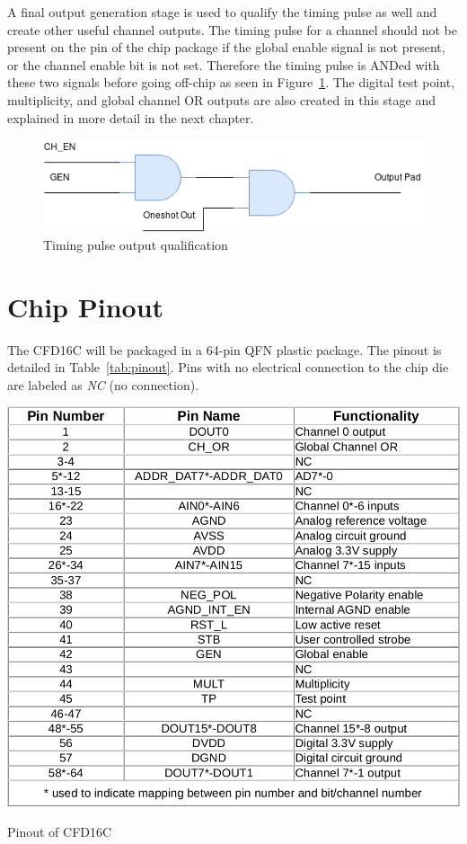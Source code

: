 \documentclass[12pt,oneside,final]{siuethesis}
\theoremstyle{definition}
\begin{document}
\par A final output generation stage is used to qualify the timing pulse as well and create other useful channel outputs. The timing pulse for a channel should not be present on the pin of the chip package if the global enable signal is not present, or the channel enable bit is not set. Therefore the timing pulse is ANDed with these two signals before going off-chip as seen in Figure~\ref{fig:output-qual}. The digital test point, multiplicity, and global channel OR outputs are also created in this stage and explained in more detail in the next chapter.\\

\begin{figure}[h!]
\centering
\includegraphics[scale=.7,keepaspectratio=true]{./ch2_figures/output.png} 
\caption{Timing pulse output qualification}
\label{fig:output-qual}
\end{figure}



\section{Chip Pinout}
\par The CFD16C will be packaged in a 64-pin QFN plastic package. The pinout is detailed in Table~\ref{tab:pinout}. Pins with no electrical connection to the chip die are labeled as \emph{NC} (no connection).



\begin{table}[htbp!]
 \centering
 \includegraphics[scale=.35,keepaspectratio=true]{./ch2_figures/pinout.png}
 \caption{Pinout of CFD16C}
 \label{tab:pinout}
\end{table}
\end{document}
